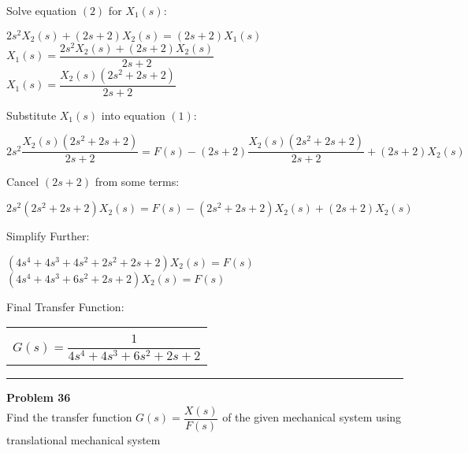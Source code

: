 \documentclass[11pt,letterpaper]{article}
\begin{document}
Solve equation $(2)$ for $X_1(s)$:\\
\begin{center}
	$2s^2X_2(s)+(2s+2)X_2(s)=(2s+2)X_1(s)$\\[12pt]
	$X_1(s)=\dfrac{2s^2X_2(s)+(2s+2)X_2(s)}{2s+2}$\\[12pt]
	$X_1(s)=\dfrac{X_2(s)(2s^2+2s+2)}{2s+2}$\\[12pt]
\end{center}
Substitute $X_1(s)$ into equation $(1)$:\\
\begin{center}
	$2s^2\dfrac{X_2(s)(2s^2+2s+2)}{2s+2}=F(s)-(2s+2)\dfrac{X_2(s)(2s^2+2s+2)}{2s+2}+(2s+2)X_2(s)$\\[12pt]
\end{center}
Cancel $(2s+2)$ from some terms:\\
\begin{center}
	$2s^2(2s^2+2s+2)X_2(s)=F(s)-(2s^2+2s+2)X_2(s)+(2s+2)X_2(s)$\\
\end{center}
Simplify Further:\\
\begin{center}
	$(4s^4+4s^3+4s^2+2s^2+2s+2)X_2(s)=F(s)$\\[12pt]
	$(4s^4+4s^3+6s^2+2s+2)X_2(s)=F(s)$\\[12pt]
\end{center}
Final Transfer Function:\\
\begin{center}
	\begin{tabular}{|c|}
		\hline \\
		$G(s)=\dfrac{1}{4s^4+4s^3+6s^2+2s+2}$\\[12pt]
	\hline
	\end{tabular}	
\end{center}


\clearpage


\rule{\textwidth}{1pt}
\textbf{Problem 36}\\
Find the transfer function $G(s)=\dfrac{X(s)}{F(s)}$ of the given mechanical system using translational mechanical system\\
\end{document}
